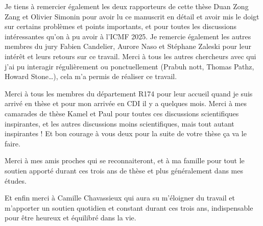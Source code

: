 Je tiens à remercier également les deux rapporteurs de cette thèse Duan Zong Zang et Olivier Simonin pour avoir lu ce manuscrit en détail et avoir mis le doigt sur certains problèmes et points importants, et pour toutes les discussions intéressantes qu'on à pu avoir à l'ICMF 2025. 
Je remercie également les autres membres du jury Fabien Candelier, Aurore Naso et Stéphane Zaleski pour leur intérêt et leurs retours sur ce travail. 
Merci à tous les autres chercheurs avec qui j'ai pu interagir régulièrement ou ponctuellement (Prabuh nott,  Thomas Pathz, Howard Stone\ldots), cela m'a permis de réaliser ce travail. 


Merci à tous les membres du département R174 pour leur accueil quand je suis arrivé en thèse et pour mon arrivée en CDI il y a quelques mois. 
Merci à mes camarades de thèse Kamel et Paul pour toutes ces discussions scientifiques inspirantes, et les autres discussions moins scientifiques, mais tout autant inspirantes ! Et bon courage à vous deux pour la suite de  votre thèse ça va le faire. 

Merci à mes amis proches qui se reconnaiteront, et à ma famille pour tout le soutien apporté durant ces trois ans de thèse et plus généralement dans mes études. 

Et enfin merci à Camille Chavassieux qui aura su m'éloigner du travail et m'apporter un soutien quotidien et constant durant ces trois ans, indispensable pour être heureux et équilibré dans la vie.  

\newpage